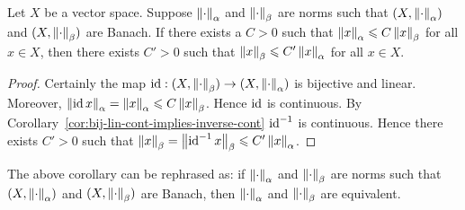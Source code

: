 \begin{corollary}\label{cor:banach-implies-equivalent-norms}
    Let $X$ be a vector space. Suppose $\left\lVert \cdot \right\rVert_\alpha$ and $\left\lVert \cdot \right\rVert_\beta$ are norms such that $(X,\left\lVert \cdot \right\rVert_\alpha)$ and $(X,\left\lVert \cdot \right\rVert_\beta)$ are Banach. If there exists a $C > 0$ such that $\left\lVert x \right\rVert_\alpha \leqslant C \left\lVert x \right\rVert_\beta$ for all $x \in X$, then there exists $C' > 0$ such that $\left\lVert x \right\rVert_\beta \leqslant C' \left\lVert x \right\rVert_\alpha$ for all $x \in X$.
\end{corollary}
    \begin{proof}
        Certainly the map $\operatorname{id}:(X,\left\lVert \cdot \right\rVert_\beta) \rightarrow (X,\left\lVert \cdot \right\rVert_\alpha)$ is bijective and linear. Moreover, $\left\lVert \operatorname{id} x \right\rVert_\alpha = \left\lVert x \right\rVert_\alpha \leqslant C \left\lVert x \right\rVert_\beta$. Hence $\operatorname{id}$ is continuous. By Corollary~\ref{cor:bij-lin-cont-implies-inverse-cont} $\operatorname{id}^{-1}$ is continuous. Hence there exists $C'>0$ such that $\left\lVert x \right\rVert_\beta = \left\lVert \operatorname{id}^{-1} x \right\rVert_\beta \leqslant C'\left\lVert x \right\rVert_\alpha$.
    \end{proof}

\begin{remark}
    The above corollary can be rephrased as: if $\left\lVert \cdot \right\rVert_\alpha$ and $\left\lVert \cdot \right\rVert_\beta$ are norms such that $(X,\left\lVert \cdot \right\rVert_\alpha)$ and $(X,\left\lVert \cdot \right\rVert_\beta)$ are Banach, then $\left\lVert \cdot \right\rVert_\alpha$ and $\left\lVert \cdot \right\rVert_\beta$ are equivalent.
\end{remark}

